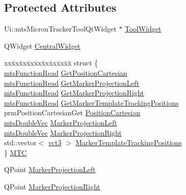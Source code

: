 \subsection*{Protected Attributes}
\begin{DoxyCompactItemize}
\item 
Ui\+::mts\+Micron\+Tracker\+Tool\+Qt\+Widget $\ast$ \hyperlink{classmts_micron_tracker_tool_qt_component_a78d45496b35b856b483e6600599dc4a4}{Tool\+Widget}
\item 
Q\+Widget \hyperlink{classmts_micron_tracker_tool_qt_component_a3337bf48f13cbad9c9101c9aff7a651f}{Central\+Widget}
\item 
\begin{tabbing}
xx\=xx\=xx\=xx\=xx\=xx\=xx\=xx\=xx\=\kill
struct \{\\
\>\hyperlink{classmts_function_read}{mtsFunctionRead} \hyperlink{classmts_micron_tracker_tool_qt_component_accf890d374d0341c43fa64d5f87d170e}{GetPositionCartesian}\\
\>\hyperlink{classmts_function_read}{mtsFunctionRead} \hyperlink{classmts_micron_tracker_tool_qt_component_a2abf35a246c2f4d85351f8d7a08b3e23}{GetMarkerProjectionLeft}\\
\>\hyperlink{classmts_function_read}{mtsFunctionRead} \hyperlink{classmts_micron_tracker_tool_qt_component_aba2e8b10296d4678cfc7000c0e3e0c51}{GetMarkerProjectionRight}\\
\>\hyperlink{classmts_function_read}{mtsFunctionRead} \hyperlink{classmts_micron_tracker_tool_qt_component_a50e15e14b556c72dea6ce2fed154757c}{GetMarkerTemplateTrackingPositions}\\
\>prmPositionCartesianGet \hyperlink{classmts_micron_tracker_tool_qt_component_a9ce46838a73866850a7a06a339b4d121}{PositionCartesian}\\
\>\hyperlink{mts_vector_8h_af69167a5dc2ad33eb93965b9387d8403}{mtsDoubleVec} \hyperlink{classmts_micron_tracker_tool_qt_component_a1c3d33fbe36a6456bc41353957493b37}{MarkerProjectionLeft}\\
\>\hyperlink{mts_vector_8h_af69167a5dc2ad33eb93965b9387d8403}{mtsDoubleVec} \hyperlink{classmts_micron_tracker_tool_qt_component_ab0ed4ae030ebd937c8719cc8e4457289}{MarkerProjectionRight}\\
\>std::vector$<$ \hyperlink{vct_fixed_size_vector_types_8h_a3af82acdbf4eeb73c551909240b106ea}{vct3} $>$ \hyperlink{classmts_micron_tracker_tool_qt_component_a279cda1e8aff6c12de27f2bbe39bc1d9}{MarkerTemplateTrackingPositions}\\
\} \hyperlink{classmts_micron_tracker_tool_qt_component_ac9dad5a29fce9eee8f3af30cdaf41ddf}{MTC}\\

\end{tabbing}\item 
Q\+Point \hyperlink{classmts_micron_tracker_tool_qt_component_a767c7737649f8612dc6df81df6453bd8}{Marker\+Projection\+Left}
\item 
Q\+Point \hyperlink{classmts_micron_tracker_tool_qt_component_a64ed0572f729b8a0505f4b28d7cf20fe}{Marker\+Projection\+Right}
\end{DoxyCompactItemize}
